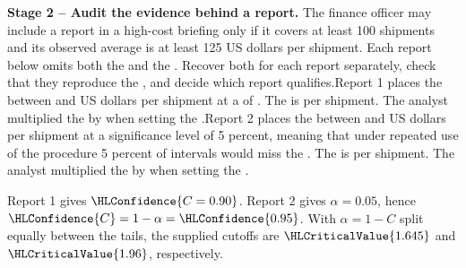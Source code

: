\textbf{Stage 2 -- Audit the evidence behind a report.} The finance officer may include a report in a high-cost briefing only if it covers at least 100 shipments and its observed average is at least 125 US dollars per shipment. Each report below omits both the   and the  . Recover both for each report separately, check that they reproduce the , and decide which report qualifies.\newline Report 1 places the  between  and  US dollars per shipment at a  of . The   is  per shipment. The analyst multiplied the   by  when setting the   .\newline Report 2 places the  between  and  US dollars per shipment at a significance level of 5 percent, meaning that under repeated use of the procedure 5 percent of intervals would miss the . The   is  per shipment. The analyst multiplied the   by  when setting the   .
\par\endgroup

Report 1 gives $\HLConfidence{C=0.90}$. Report 2 gives $\alpha=0.05$, hence $\HLConfidence{C}=1-\alpha=\HLConfidence{0.95}$. With $\alpha=1-C$ split equally between the tails, the supplied cutoffs are $\HLCriticalValue{1.645}$ and $\HLCriticalValue{1.96}$, respectively.

